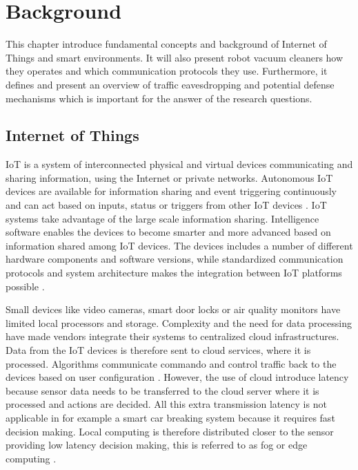 \chapter{Background}
This chapter introduce fundamental concepts and background of Internet of Things and smart environments. It will also present robot vacuum cleaners how they operates and which communication protocols they use. Furthermore, it defines and present an overview of traffic eavesdropping and potential defense mechanisms which is important for the answer of the research questions. 

\section{Internet of Things}
IoT is a system of interconnected physical and virtual devices communicating and sharing information, using the Internet or private networks. Autonomous IoT devices are available for information sharing and event triggering continuously and can act based on inputs, status or triggers from other IoT devices \cite{atlam2020iot}. IoT systems take advantage of the large scale information sharing. Intelligence software enables the devices to become smarter and more advanced based on information shared among IoT devices. The devices includes a number of different hardware components and software versions, while standardized communication protocols and system architecture makes the integration between IoT platforms possible \cite{atlam2020iot}. 

Small devices like video cameras, smart door locks or air quality monitors have limited local processors and storage. Complexity and the need for data processing have made vendors integrate their systems to centralized cloud infrastructures. Data from the IoT devices is therefore sent to cloud services, where it is processed. Algorithms communicate commando and control traffic back to the devices based on user configuration \cite{pavelic2018internet}. However, the use of cloud introduce latency because sensor data needs to be transferred to the cloud server where it is processed and actions are decided. All this extra transmission latency is not applicable in for example a smart car breaking system because it requires fast decision making. Local computing is therefore distributed closer to the sensor providing low latency decision making, this is referred to as fog or edge computing \cite{mocrii2018iot}.   

